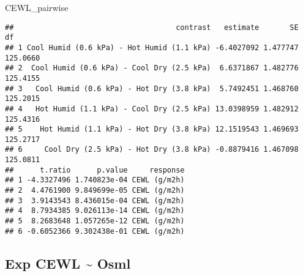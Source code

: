 \documentclass[
]{article}
\newenvironment{Shaded}{\begin{snugshade}}{\end{snugshade}}
\newcommand{\NormalTok}[1]{#1}
\begin{document}
\begin{Shaded}
\begin{Highlighting}[]
\NormalTok{CEWL\_pairwise}
\end{Highlighting}
\end{Shaded}

\begin{verbatim}
##                                     contrast   estimate       SE       df
## 1 Cool Humid (0.6 kPa) - Hot Humid (1.1 kPa) -6.4027092 1.477747 125.0660
## 2  Cool Humid (0.6 kPa) - Cool Dry (2.5 kPa)  6.6371867 1.482776 125.4155
## 3   Cool Humid (0.6 kPa) - Hot Dry (3.8 kPa)  5.7492451 1.468760 125.2015
## 4   Hot Humid (1.1 kPa) - Cool Dry (2.5 kPa) 13.0398959 1.482912 125.4316
## 5    Hot Humid (1.1 kPa) - Hot Dry (3.8 kPa) 12.1519543 1.469693 125.2717
## 6     Cool Dry (2.5 kPa) - Hot Dry (3.8 kPa) -0.8879416 1.467098 125.0811
##      t.ratio      p.value     response
## 1 -4.3327496 1.740823e-04 CEWL (g/m2h)
## 2  4.4761900 9.849699e-05 CEWL (g/m2h)
## 3  3.9143543 8.436015e-04 CEWL (g/m2h)
## 4  8.7934385 9.026113e-14 CEWL (g/m2h)
## 5  8.2683648 1.057265e-12 CEWL (g/m2h)
## 6 -0.6052366 9.302438e-01 CEWL (g/m2h)
\end{verbatim}

\hypertarget{exp-cewl-osml}{%
\subsection{Exp CEWL \textasciitilde{} Osml}\label{exp-cewl-osml}}
\end{document}
